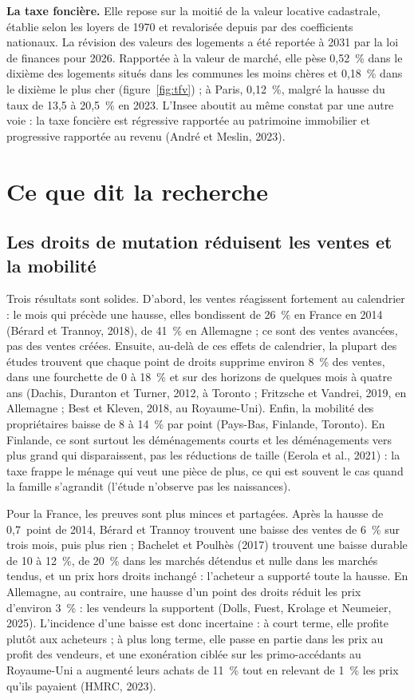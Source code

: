 \documentclass[11pt,a4paper]{article}
\begin{document}
\textbf{La taxe foncière.} Elle repose sur la moitié de la valeur locative cadastrale, établie selon les loyers
de 1970 et revalorisée depuis par des coefficients nationaux. La révision des valeurs des logements a été
reportée à 2031 par la loi de finances pour 2026. Rapportée à la valeur de marché, elle pèse 0,52~\% dans le
dixième des logements situés dans les communes les moins chères et 0,18~\% dans le dixième le plus cher
(figure~\ref{fig:tfv}) ; à Paris, 0,12~\%, malgré la hausse du taux de 13,5 à 20,5~\% en 2023. L'Insee aboutit au même constat par une autre voie : la taxe
foncière est régressive rapportée au patrimoine immobilier et progressive rapportée au revenu (André et
Meslin, 2023).

\section{Ce que dit la recherche}

\subsection*{Les droits de mutation réduisent les ventes et la mobilité}

Trois résultats sont solides. D'abord, les ventes réagissent fortement au calendrier : le mois qui précède
une hausse, elles bondissent de 26~\% en France en 2014 (Bérard et Trannoy, 2018), de 41~\% en Allemagne ;
ce sont des ventes avancées, pas des ventes créées. Ensuite, au-delà de ces effets de calendrier, la plupart
des études trouvent que chaque point de droits supprime environ 8~\% des ventes, dans une fourchette de 0 à
18~\% et sur des horizons de quelques mois à quatre ans (Dachis, Duranton et Turner, 2012, à Toronto ; Fritzsche et Vandrei, 2019, en
Allemagne ; Best et Kleven, 2018, au Royaume-Uni). Enfin, la mobilité des propriétaires baisse de 8 à 14~\%
par point (Pays-Bas, Finlande, Toronto). En Finlande, ce sont surtout les déménagements courts et les
déménagements vers plus grand qui disparaissent, pas les réductions de taille (Eerola et al., 2021) : la taxe
frappe le ménage qui veut une pièce de plus, ce qui est souvent le cas quand la famille s'agrandit (l'étude
n'observe pas les naissances).

Pour la France, les preuves sont plus minces et partagées. Après la hausse de 0,7~point de 2014, Bérard et
Trannoy trouvent une baisse des ventes de 6~\% sur trois mois, puis plus rien ; Bachelet et Poulhès (2017)
trouvent une baisse durable de 10 à 12~\%, de 20~\% dans les marchés détendus et nulle dans les marchés
tendus, et un prix hors droits inchangé : l'acheteur a supporté toute la hausse. En Allemagne, au contraire,
une hausse d'un point des droits réduit les prix d'environ 3~\% : les vendeurs la supportent (Dolls, Fuest,
Krolage et Neumeier, 2025). L'incidence d'une baisse est donc incertaine : à court terme, elle profite
plutôt aux acheteurs ; à plus long terme, elle passe en partie dans les prix au profit des vendeurs, et une
exonération ciblée sur les primo-accédants au Royaume-Uni a augmenté leurs achats de 11~\% tout en relevant
de 1~\% les prix qu'ils payaient (HMRC, 2023).
\end{document}
